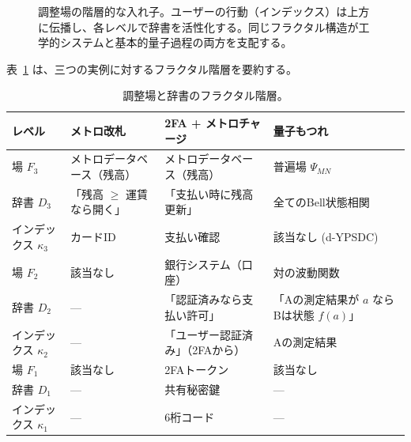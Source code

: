 \documentclass[12pt,a4paper]{article}
\theoremstyle{definition}
\theoremstyle{remark}
\begin{document}
	\begin{figure}[htbp]
		\centering
		\caption{調整場の階層的な入れ子。ユーザーの行動（インデックス）は上方に伝播し、各レベルで辞書を活性化する。同じフラクタル構造が工学的システムと基本的量子過程の両方を支配する。}
		\label{fig:hierarchy}
	\end{figure}
	
	表~\ref{tab:fractal-examples} は、三つの実例に対するフラクタル階層を要約する。
	
	\begin{table}[htbp]
		\centering
		\caption{調整場と辞書のフラクタル階層。}
		\label{tab:fractal-examples}
		\small
		\begin{tabular}{p{2.2cm} p{3.5cm} p{3.5cm} p{3.5cm}}
			\toprule
			\textbf{レベル} & \textbf{メトロ改札} & \textbf{2FA + メトロチャージ} & \textbf{量子もつれ} \\
			\midrule
			場 $F_3$ & メトロデータベース（残高） & メトロデータベース（残高） & 普遍場 $\Psi_{MN}$ \\
			辞書 $D_3$ & 「残高 $\ge$ 運賃なら開く」 & 「支払い時に残高更新」 & 全てのBell状態相関 \\
			インデックス $\kappa_3$ & カードID & 支払い確認 & 該当なし (d-YPSDC) \\
			\midrule
			場 $F_2$ & 該当なし & 銀行システム（口座） & 対の波動関数 \\
			辞書 $D_2$ & --- & 「認証済みなら支払い許可」 & 「Aの測定結果が $a$ ならBは状態 $f(a)$」 \\
			インデックス $\kappa_2$ & --- & 「ユーザー認証済み」（2FAから） & Aの測定結果 \\
			\midrule
			場 $F_1$ & 該当なし & 2FAトークン & 該当なし \\
			辞書 $D_1$ & --- & 共有秘密鍵 & --- \\
			インデックス $\kappa_1$ & --- & 6桁コード & --- \\
			\bottomrule
		\end{tabular}
	\end{table}
	
\end{document}
